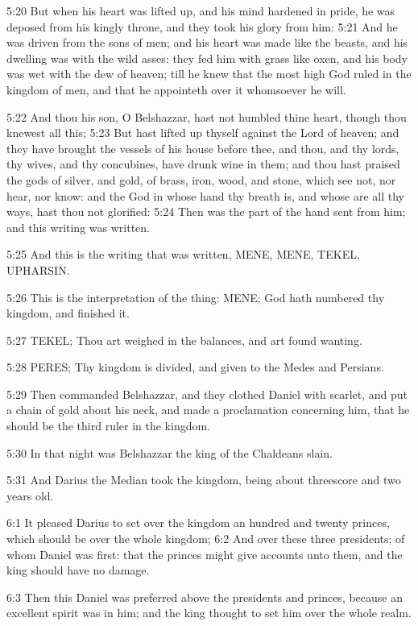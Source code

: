5:20 But when his heart was lifted up, and his mind hardened in pride,
he was deposed from his kingly throne, and they took his glory from
him: 5:21 And he was driven from the sons of men; and his heart was
made like the beasts, and his dwelling was with the wild asses: they
fed him with grass like oxen, and his body was wet with the dew of
heaven; till he knew that the most high God ruled in the kingdom of
men, and that he appointeth over it whomsoever he will.

5:22 And thou his son, O Belshazzar, hast not humbled thine heart,
though thou knewest all this; 5:23 But hast lifted up thyself against
the Lord of heaven; and they have brought the vessels of his house
before thee, and thou, and thy lords, thy wives, and thy concubines,
have drunk wine in them; and thou hast praised the gods of silver, and
gold, of brass, iron, wood, and stone, which see not, nor hear, nor
know: and the God in whose hand thy breath is, and whose are all thy
ways, hast thou not glorified: 5:24 Then was the part of the hand sent
from him; and this writing was written.

5:25 And this is the writing that was written, MENE, MENE, TEKEL,
UPHARSIN.

5:26 This is the interpretation of the thing: MENE; God hath numbered
thy kingdom, and finished it.

5:27 TEKEL; Thou art weighed in the balances, and art found wanting.

5:28 PERES; Thy kingdom is divided, and given to the Medes and
Persians.

5:29 Then commanded Belshazzar, and they clothed Daniel with scarlet,
and put a chain of gold about his neck, and made a proclamation
concerning him, that he should be the third ruler in the kingdom.

5:30 In that night was Belshazzar the king of the Chaldeans slain.

5:31 And Darius the Median took the kingdom, being about threescore
and two years old.

6:1 It pleased Darius to set over the kingdom an hundred and twenty
princes, which should be over the whole kingdom; 6:2 And over these
three presidents; of whom Daniel was first: that the princes might
give accounts unto them, and the king should have no damage.

6:3 Then this Daniel was preferred above the presidents and princes,
because an excellent spirit was in him; and the king thought to set
him over the whole realm.

